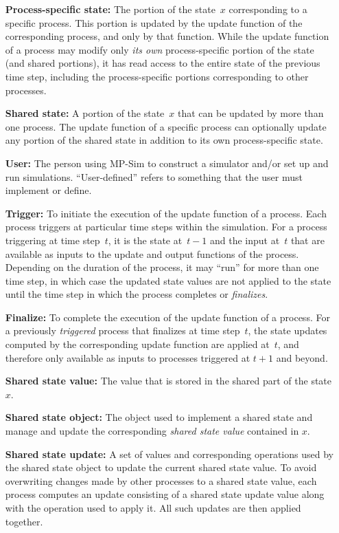 \documentclass[12pt]{article}
\newcommand{\mpsim}[0]{{MP-Sim}}
\numberwithin{equation}{section}
\numberwithin{table}{section}
\numberwithin{figure}{section}
\begin{document}
\begin{itemize}
\item[\bf Process-specific state:] The portion of the state~$x$ corresponding to a specific process. This portion is updated by the update function of the corresponding process, and only by that function. While the update function of a process may modify only \emph{its own} process-specific portion of the state (and shared portions), it has read access to the entire state of the previous time step, including the process-specific portions corresponding to other processes.
\item[\bf Shared state:] A portion of the state~$x$ that can be updated by more than one process. The update function of a specific process can optionally update any portion of the shared state in addition to its own process-specific state.
\item[\bf User:] The person using \mpsim{} to construct a simulator and/or set up and run simulations. ``User-defined'' refers to something that the user must implement or define.
\item[\bf Trigger:] To initiate the execution of the update function of a process. Each process triggers at particular time steps within the simulation. For a process triggering at time step~$t$, it is the state at~$t-1$ and the input at~$t$ that are available as inputs to the update and output functions of the process. Depending on the duration of the process, it may ``run'' for more than one time step, in which case the updated state values are not applied to the state until the time step in which the process completes or \emph{finalizes}.
\item[\bf Finalize:] To complete the execution of the update function of a process. For a previously \emph{triggered} process that finalizes at time step~$t$, the state updates computed by the corresponding update function are applied at~$t$, and therefore only available as inputs to processes triggered at $t+1$ and beyond.
\item[\bf Shared state value:] The value that is stored in the shared part of the state $x$.
\item[\bf Shared state object:] The object used to implement a shared state and manage and update the corresponding \emph{shared state value} contained in $x$.
\item[\bf Shared state update:] A set of values and corresponding operations used by the shared state object to update the current shared state value. To avoid overwriting changes made by other processes to a shared state value, each process computes an update consisting of a shared state update value along with the operation used to apply it. All such updates are then applied together.
\end{itemize}
\end{document}
